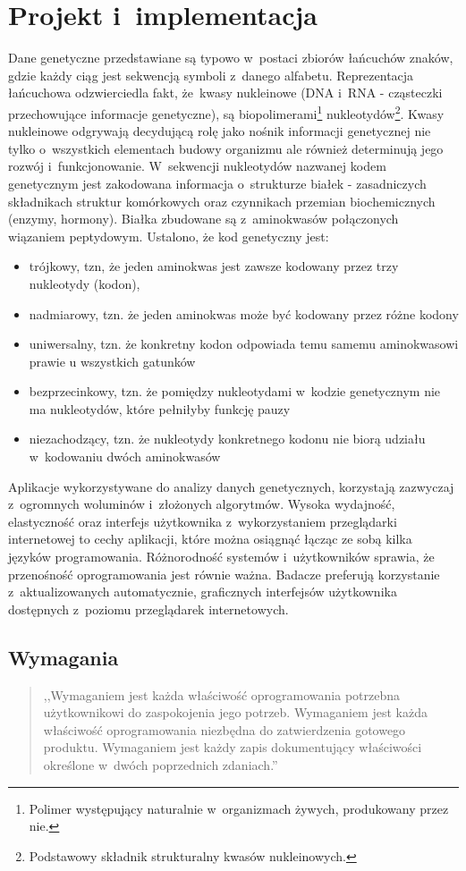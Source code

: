 \documentclass[a4paper,12pt,oneside]{mwrep}  %
\begin{document}
\chapter{Projekt i~implementacja}
Dane genetyczne przedstawiane są typowo w~postaci zbiorów łańcuchów znaków, gdzie każdy ciąg jest sekwencją symboli z~danego alfabetu. Reprezentacja łańcuchowa odzwierciedla fakt, że~kwasy nukleinowe (DNA i~RNA - cząsteczki przechowujące informacje genetyczne), są biopolimerami\footnote{Polimer występujący naturalnie w~organizmach żywych, produkowany przez nie.} 
nukleotydów\footnote{Podstawowy składnik strukturalny kwasów nukleinowych.}.
Kwasy nukleinowe odgrywają decydującą rolę jako nośnik informacji genetycznej nie tylko o~wszystkich elementach budowy organizmu ale również determinują jego rozwój i~funkcjonowanie. W~sekwencji nukleotydów nazwanej kodem genetycznym jest zakodowana informacja o~strukturze białek - zasadniczych składnikach struktur komórkowych oraz czynnikach przemian biochemicznych (enzymy, hormony). Białka zbudowane są z~aminokwasów połączonych wiązaniem peptydowym. 
Ustalono, że kod genetyczny jest:
\begin{itemize}
\item trójkowy, tzn, że jeden aminokwas jest zawsze kodowany przez trzy nukleotydy (kodon), 
\item nadmiarowy, tzn. że jeden aminokwas może być kodowany przez różne kodony
\item uniwersalny, tzn. że konkretny kodon odpowiada temu samemu aminokwasowi prawie u wszystkich gatunków
\item bezprzecinkowy, tzn. że pomiędzy nukleotydami w~kodzie genetycznym nie ma nukleotydów, które pełniłyby funkcję pauzy
\item niezachodzący, tzn. że nukleotydy konkretnego kodonu nie biorą udziału w~kodowaniu dwóch aminokwasów
\end{itemize}
 
Aplikacje wykorzystywane do analizy danych genetycznych, korzystają zazwyczaj z~ogromnych woluminów i~złożonych algorytmów. Wysoka wydajność, elastyczność oraz interfejs użytkownika z~wykorzystaniem przeglądarki internetowej to cechy aplikacji, które można osiągnąć łącząc ze sobą kilka języków programowania.
Różnorodność systemów i~użytkowników sprawia, że przenośność oprogramowania jest równie ważna. Badacze preferują korzystanie z~aktualizowanych automatycznie, graficznych interfejsów użytkownika dostępnych z~poziomu przeglądarek internetowych.

\section{Wymagania}
\begin{quote}
,,Wymaganiem jest każda właściwość oprogramowania potrzebna użytkownikowi do
zaspokojenia jego potrzeb. Wymaganiem jest każda właściwość oprogramowania
niezbędna do zatwierdzenia gotowego produktu. Wymaganiem jest każdy zapis dokumentujący właściwości określone w~dwóch poprzednich zdaniach.'' \cite{IEEE-wymagania} %
\end{quote}
\end{document}
